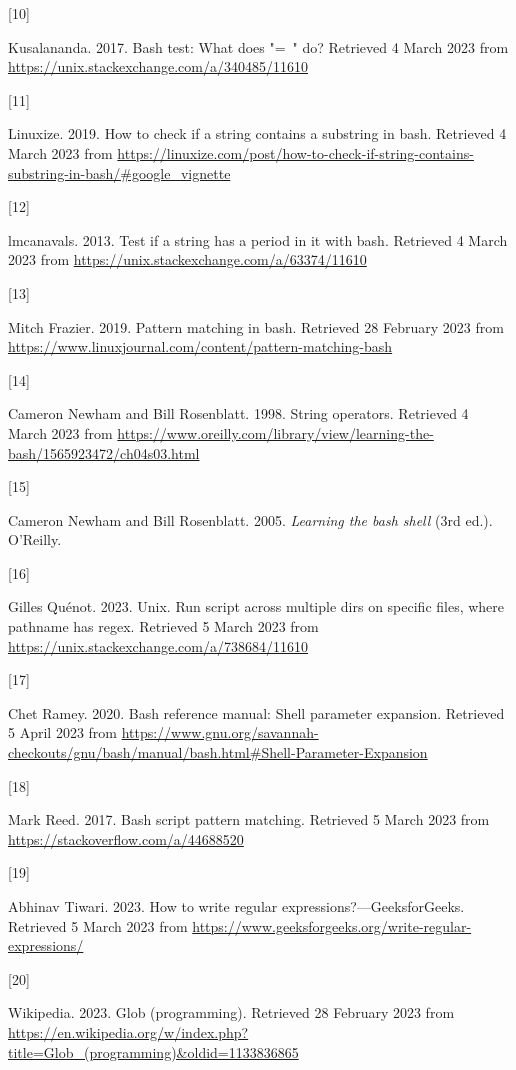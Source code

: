 \documentclass[
  a4paper,
]{article}
\newlength{\cslhangindent}
\newlength{\csllabelwidth}
\newlength{\cslentryspacingunit} %
\newenvironment{CSLReferences}[2] %
 {%
  \setlength{\parindent}{0pt}
  \ifodd #1
  \let\oldpar\par
  \def\par{\hangindent=\cslhangindent\oldpar}
  \fi
  \setlength{\parskip}{#2\cslentryspacingunit}
 }%
 {}
\newcommand{\CSLLeftMargin}[1]{\parbox[t]{\csllabelwidth}{#1}}
\newcommand{\CSLRightInline}[1]{\parbox[t]{\linewidth - \csllabelwidth}{#1}\break}
\begin{document}
\begin{CSLReferences}{0}{0}
\leavevmode{}%
\CSLLeftMargin{{[}10{]} }%
\CSLRightInline{Kusalananda. 2017. Bash test: What does "=~" do?
Retrieved 4 March 2023 from
\url{https://unix.stackexchange.com/a/340485/11610}}

\leavevmode{}%
\CSLLeftMargin{{[}11{]} }%
\CSLRightInline{Linuxize. 2019. How to check if a string contains a
substring in bash. Retrieved 4 March 2023 from
\url{https://linuxize.com/post/how-to-check-if-string-contains-substring-in-bash/\#google_vignette}}

\leavevmode{}%
\CSLLeftMargin{{[}12{]} }%
\CSLRightInline{lmcanavals. 2013. Test if a string has a period in it
with bash. Retrieved 4 March 2023 from
\url{https://unix.stackexchange.com/a/63374/11610}}

\leavevmode{}%
\CSLLeftMargin{{[}13{]} }%
\CSLRightInline{Mitch Frazier. 2019. Pattern matching in bash. Retrieved
28 February 2023 from
\url{https://www.linuxjournal.com/content/pattern-matching-bash}}

\leavevmode{}%
\CSLLeftMargin{{[}14{]} }%
\CSLRightInline{Cameron Newham and Bill Rosenblatt. 1998. String
operators. Retrieved 4 March 2023 from
\url{https://www.oreilly.com/library/view/learning-the-bash/1565923472/ch04s03.html}}

\leavevmode{}%
\CSLLeftMargin{{[}15{]} }%
\CSLRightInline{Cameron Newham and Bill Rosenblatt. 2005. \emph{Learning
the bash shell} (3rd ed.). O'Reilly.}

\leavevmode{}%
\CSLLeftMargin{{[}16{]} }%
\CSLRightInline{Gilles Quénot. 2023. Unix. Run script across multiple
dirs on specific files, where pathname has regex. Retrieved 5 March 2023
from \url{https://unix.stackexchange.com/a/738684/11610}}

\leavevmode{}%
\CSLLeftMargin{{[}17{]} }%
\CSLRightInline{Chet Ramey. 2020. Bash reference manual: Shell parameter
expansion. Retrieved 5 April 2023 from
\url{https://www.gnu.org/savannah-checkouts/gnu/bash/manual/bash.html\#Shell-Parameter-Expansion}}

\leavevmode{}%
\CSLLeftMargin{{[}18{]} }%
\CSLRightInline{Mark Reed. 2017. Bash script pattern matching. Retrieved
5 March 2023 from \url{https://stackoverflow.com/a/44688520}}

\leavevmode{}%
\CSLLeftMargin{{[}19{]} }%
\CSLRightInline{Abhinav Tiwari. 2023. How to write regular
expressions?---GeeksforGeeks. Retrieved 5 March 2023 from
\url{https://www.geeksforgeeks.org/write-regular-expressions/}}

\leavevmode{}%
\CSLLeftMargin{{[}20{]} }%
\CSLRightInline{Wikipedia. 2023. Glob (programming). Retrieved 28
February 2023 from
\url{https://en.wikipedia.org/w/index.php?title=Glob_(programming)\&oldid=1133836865}}

\end{CSLReferences}
\end{document}
